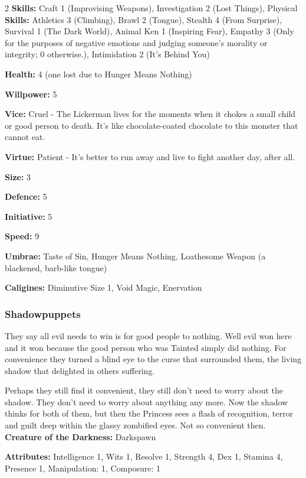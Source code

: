 \begin{multicols}{2}
\noindent \textbf{Skills:} Craft 1 (Improvising Weapons), Investigation 2 (Lost Things), Physical \noindent \textbf{Skills:} Athletics 3 (Climbing), Brawl 2 (Tongue), Stealth 4 (From Surprise), Survival 1 (The Dark World), Animal Ken 1 (Inspiring Fear), Empathy 3 (Only for the purposes of negative emotions and judging someone's morality or integrity; 0 otherwise.), Intimidation 2 (It's Behind You)

\noindent \textbf{Health:} 4 (one lost due to Hunger Means Nothing)

\noindent \textbf{Willpower:} 5

\noindent \textbf{Vice:} Cruel - The Lickerman lives for the moments when it chokes a small child or good person to death. It's like chocolate-coated chocolate to this monster that cannot eat.

\noindent \textbf{Virtue:} Patient - It's better to run away and live to fight another day, after all.

\noindent \textbf{Size:} 3

\noindent \textbf{Defence:} 5

\noindent \textbf{Initiative:} 5

\noindent \textbf{Speed:} 9

\noindent \textbf{Umbrae:} Taste of Sin, Hunger Means Nothing, Loathesome Weapon (a blackened, barb-like tongue)

\noindent \textbf{Caligines:} Diminutive Size 1, Void Magic, Enervation

\subsubsection*{Shadowpuppets}

They say all evil needs to win is for good people to nothing. Well evil won here and it won because the good person who was Tainted simply did nothing. For convenience they turned a blind eye to the curse that surrounded them, the living shadow that delighted in others suffering.

Perhaps they still find it convenient, they still don't need to worry about the shadow. They don't need to worry about anything any more. Now the shadow thinks for both of them, but then the Princess sees a flash of recognition, terror and guilt deep within the glassy zombified eyes. Not so convenient then.\\

\noindent \textbf{Creature of the Darkness:} Darkspawn

\noindent \textbf{Attributes:} Intelligence 1, Wits 1, Resolve 1, Strength 4, Dex 1, Stamina 4, Presence 1, Manipulation: 1, Composure: 1


\end{multicols}
